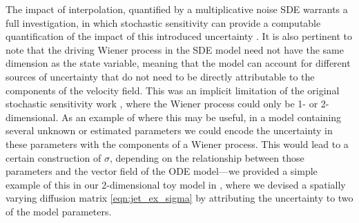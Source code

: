 The impact of interpolation, quantified by a multiplicative noise SDE warrants a full investigation, in which stochastic sensitivity can provide a computable quantification of the impact of this introduced uncertainty \citep{FangEtAl_2020_DisentanglingResolutionPrecision,FangOuellette_2021_AssessingInformationContent}.
It is also pertinent to note that the driving Wiener process in the SDE model need not have the same dimension as the state variable, meaning that the model can account for different sources of uncertainty that do not need to be directly attributable to the components of the velocity field.
This was an implicit limitation of the original stochastic sensitivity work \citep{Balasuriya_2020_StochasticSensitivityComputable}, where the Wiener process could only be 1- or 2-dimensional.
As an example of where this may be useful, in a model containing several unknown or estimated parameters we could encode the uncertainty in these parameters with the components of a Wiener process.
This would lead to a certain construction of \(\sigma\), depending on the relationship between those parameters and the vector field of the ODE model---we provided a simple example of this in our 2-dimensional toy model in , where we devised a spatially varying diffusion matrix \cref{eqn:jet_ex_sigma} by attributing the uncertainty to two of the model parameters.

